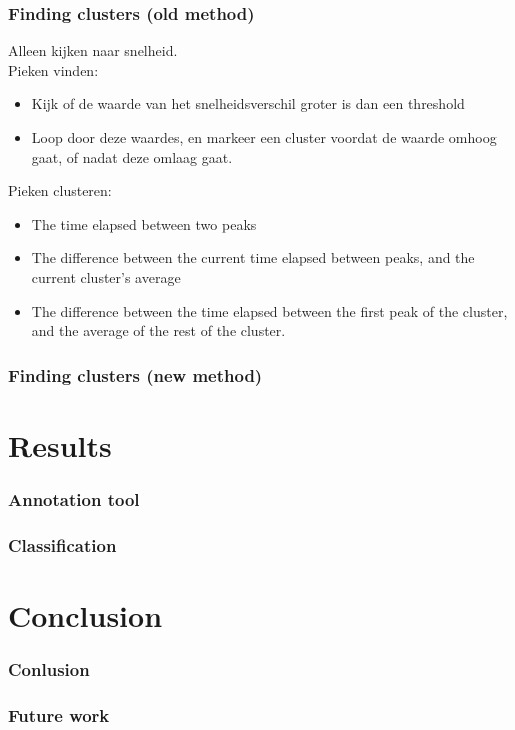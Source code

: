 \documentclass{beamer}
\newcommand{\slide}[2]
{
\begin{frame}
\frametitle{#1} 


#2

\end{frame}
}
\begin{document}
\slide{Finding clusters (old method)}
{
     Alleen kijken naar snelheid.\\
     Pieken vinden:
 \begin{itemize}
    \item Kijk of de waarde van het snelheidsverschil groter is dan een
    threshold
    \item Loop door deze waardes, en markeer een cluster voordat de waarde omhoog
    gaat, of nadat deze omlaag gaat.
 \end{itemize}
    Pieken clusteren:
    \begin{itemize}
 \item The time elapsed between two peaks
 \item The difference between the current time elapsed between peaks, and the
 current cluster's average
 \item The difference between the time elapsed between the first peak of the
 cluster, and the average of the rest of the cluster.
 \end{itemize}

}

\slide{Finding clusters (new method)}
{
    
}



\section{Results}
\slide{Annotation tool}
{
	
}

\slide{Classification}
{
	
}

\section{Conclusion}

\slide{Conlusion}
{
	
}

\slide{Future work}
{
	
}
\end{document}
